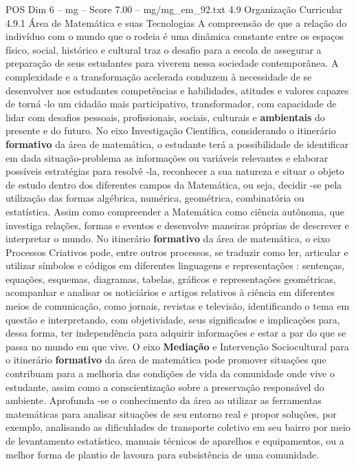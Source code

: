 \begin{textsample}{POS Dim 6 – mg – Score 7.00 – mg/mg\_em\_92.txt}  \label{ex:f6_pos_247}
4.9 Organização Curricular 4.9.1 Área de Matemática e suas Tecnologias A compreensão de que a relação do indivíduo com o mundo que o rodeia é uma dinâmica constante entre os espaços físico, social, histórico e cultural traz o desafio para a escola de assegurar a preparação de seus estudantes para viverem nessa sociedade contemporânea.
A complexidade e a transformação acelerada conduzem à necessidade de se desenvolver nos estudantes competências e habilidades, atitudes e valores capazes de torná -lo um cidadão mais participativo, transformador, com capacidade de lidar com desafios pessoais, profissionais, sociais, culturais e \textbf{ambientais} do presente e do futuro.
No eixo Investigação Científica, considerando o itinerário \textbf{formativo} da área de matemática, o estudante terá a possibilidade de identificar em dada situação-problema as informações ou variáveis relevantes e elaborar possíveis estratégias para resolvê -la, reconhecer a sua natureza e situar o objeto de estudo dentro dos diferentes campos da Matemática, ou seja, decidir -se pela utilização das formas algébrica, numérica, geométrica, combinatória ou estatística.
Assim como compreender a Matemática como ciência autônoma, que investiga relações, formas e eventos e desenvolve maneiras próprias de descrever e interpretar o mundo.
No itinerário \textbf{formativo} da área de matemática, o eixo Processos Criativos pode, entre outros processos, se traduzir como ler, articular e utilizar símbolos e códigos em diferentes linguagens e representações : sentenças, equações, esquemas, diagramas, tabelas, gráficos e representações geométricas, acompanhar e analisar os noticiários e artigos relativos à ciência em diferentes meios de comunicação, como jornais, revistas e televisão, identificando o tema em questão e interpretando, com objetividade, seus significados e implicações para, dessa forma, ter independência para adquirir informações e estar a par do que se passa no mundo em que vive.
O eixo \textbf{Mediação} e Intervenção Sociocultural para o itinerário \textbf{formativo} da área de matemática pode promover situações que contribuam para a melhoria das condições de vida da comunidade onde vive o estudante, assim como a conscientização sobre a preservação responsável do ambiente.
Aprofunda -se o conhecimento da área ao utilizar as ferramentas matemáticas para analisar situações de seu entorno real e propor soluções, por exemplo, analisando as dificuldades de transporte coletivo em seu bairro por meio de levantamento estatístico, manuais técnicos de aparelhos e equipamentos, ou a melhor forma de plantio de lavoura para subsistência de uma comunidade.

\end{textsample}
